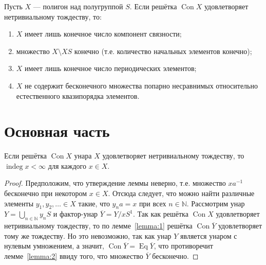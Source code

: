 \documentclass[11pt,twoside,final
]{article}
\def\Con{\operatorname{Con}}
\def\Eq{\operatorname{Eq}}
\def\indeg{\operatorname{indeg}}
\begin{document}
\begin{lemma} \label{lemma:4}
	Пусть $X$ — полигон над полугруппой $S$.
	Если решётка $\Con X$ удовлетворяет нетривиальному тождеству, то:
	\begin{enumerate}
		\item $X$ имеет лишь конечное число компонент связности;
		\item множество $X \setminus XS$ конечно (т.е. количество начальных элементов конечно);
		\item $X$ имеет лишь конечное число периодических элементов;
		\item $X$ не содержит бесконечного множества попарно несравнимых относительно естественного квазипорядка элементов.
	\end{enumerate}
\end{lemma}

\section{Основная часть}

\begin{lemma} \label{lemma:5}
	Если решётка $\Con X$ унара $X$ удовлетворяет нетривиальному тождеству, то $\indeg x < \infty$ для каждого $x \in X$.
\end{lemma}
\begin{proof}
	Предположим, что утверждение леммы неверно, т.е. множество $xa^{-1}$ бесконечно при некотором $x \in X$.
	Отсюда следует, что можно найти различные элементы $y_1, y_2, \ldots \in X $ такие, что $y_n a = x$ при всех $n \in \mathbb{N}$.
	Рассмотрим унар $Y = \bigcup_{n \in \mathbb{N}} y_n S$ и фактор-унар $\overline{Y} = Y / x S^1$.
	Так как решётка $\Con X$ удовлетворяет нетривиальному тождеству, то по лемме~\ref{lemma:1} решётка $\Con \overline{Y}$ удовлетворяет тому же тождеству.
	Но это невозможно, так как унар $Y$ является унаром с нулевым умножением, а значит, $\Con \overline{Y} = \Eq \overline{Y}$, что противоречит лемме~\ref{lemma:2} ввиду того, что множество $\overline{Y}$ бесконечно.
\end{proof}
\end{document}
